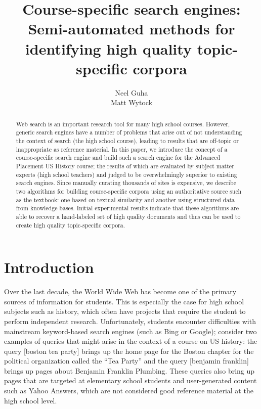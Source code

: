 \documentclass[pdfpagelabels=false,plainpages=true]{acm_proc_article-sp}
\begin{document}
\title{Course-specific search engines: Semi-automated methods for identifying
  high quality topic-specific corpora} 

\author{
  \alignauthor
  Neel Guha \\
  \alignauthor
  Matt Wytock \\
}

\maketitle
\begin{abstract}
Web search is an important research tool for many high school courses. However,
generic search engines have a number of problems that arise out of
not understanding the context of search (the high school course),
leading to results that are off-topic or inappropriate as reference material. In
this paper, we introduce the concept of a course-specific search 
engine and build such a search engine for the Advanced Placement US
History course; the results of which are evaluated by subject matter experts (high
school teachers) and judged to be overwhelmingly superior to existing search
engines. Since manually curating thousands of sites is expensive, we describe two
algorithms for building course-specific corpora using an authoritative source
such as the textbook: one  
based on textual similarity and another using structured
data from knowledge bases. Initial experimental results indicate that
these algorithms are able to recover a hand-labeled set of high quality
documents and thus can be used to create high quality topic-specific corpora.
\end{abstract}

\section{Introduction}

Over the last decade, the World Wide Web has become one of the primary sources
of information for students. This is especially the case for high school
subjects such as history, which often have projects that require the student to 
perform independent research. Unfortunately, students encounter difficulties
with mainstream keyword-based search engines (such as Bing or Google); 
consider two examples of queries that might arise in the context of a course
on US history: the query [boston tea party] brings up the home page for the
Boston chapter for the political organization called the ``Tea Party'' and the
query [benjamin franklin] brings up pages about Benjamin Franklin
Plumbing. These queries also bring up pages that are targeted at elementary
school students and user-generated content such as Yahoo Answers, which are not
considered good reference material at the high school level.
\end{document}
